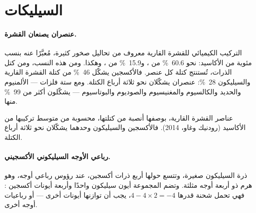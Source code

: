 \section{السيليكات}

\paragraph{عنصران يصنعان القشرة.} التركيب الكيميائي
للقشرة القارية معروف من تحاليل صخور كثيرة، مُعبَّرًا عنه
بنسب مئوية من الأكاسيد: نحو \qty{60.6}{\percent} من ،
و\qty{15.9}{\percent} من ، وهكذا. ومن هذه النسب، ومن كتل
الذرات، تُستنتج كتلة كل عنصر. فالأكسجين يشكّل \qty{46}{\percent}
من كتلة القشرة القارية والسيليكون \qty{28}{\percent}: عنصران
يشكّلان نحو ثلاثة أرباع الكتلة. ومع ستة فلزات --- الألمنيوم
والحديد والكالسيوم والمغنيسيوم والصوديوم والبوتاسيوم --- يشكّلون أكثر من
\qty{99}{\percent} منها.

\begin{omfigure}

{\small عناصر القشرة القارية، بوصفها أنصبة من كتلتها،
محسوبة من متوسط تركيبها من الأكاسيد (رودنيك وغاو، 2014).
فالأكسجين والسيليكون وحدهما يشكّلان نحو ثلاثة أرباع الكتلة.}
\end{omfigure}

\paragraph{رباعي الأوجه السيليكوني الأكسجيني.} ذرة السيليكون صغيرة،
وتتسع حولها أربع ذرات أكسجين، عند رؤوس رباعي أوجه، وهو هرم
ذو أربعة أوجه مثلثة. وتضم المجموعة أيون سيليكون واحدًا 
وأربعة أيونات أكسجين : فهي تحمل شحنة قدرها $4 - 4 \times 2 = -4$،
يجب أن توازنها أيونات أخرى --- أو رباعيات أوجه أخرى.

